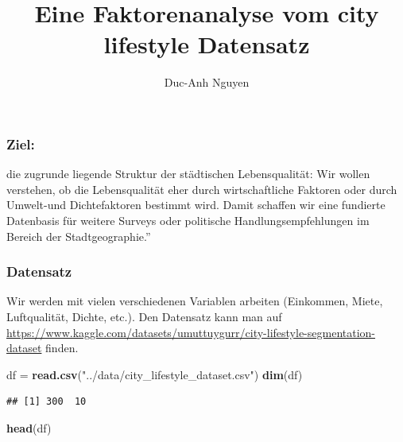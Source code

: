 \documentclass[
]{article}
\title{Eine Faktorenanalyse vom city lifestyle Datensatz}
\author{Duc-Anh Nguyen}
\date{}
\newenvironment{Shaded}{\begin{snugshade}}{\end{snugshade}}
\newcommand{\FunctionTok}[1]{\textcolor[rgb]{0.13,0.29,0.53}{\textbf{#1}}}
\newcommand{\NormalTok}[1]{#1}
\newcommand{\OtherTok}[1]{\textcolor[rgb]{0.56,0.35,0.01}{#1}}
\newcommand{\StringTok}[1]{\textcolor[rgb]{0.31,0.60,0.02}{#1}}
\begin{document}
\maketitle

\subsubsection{Ziel:}\label{ziel}

die zugrunde liegende Struktur der städtischen Lebensqualität: Wir
wollen verstehen, ob die Lebensqualität eher durch wirtschaftliche
Faktoren oder durch Umwelt-und Dichtefaktoren bestimmt wird. Damit
schaffen wir eine fundierte Datenbasis für weitere Surveys oder
politische Handlungsempfehlungen im Bereich der Stadtgeographie.''

\subsubsection{Datensatz}\label{datensatz}

Wir werden mit vielen verschiedenen Variablen arbeiten (Einkommen,
Miete, Luftqualität, Dichte, etc.). Den Datensatz kann man auf
\url{https://www.kaggle.com/datasets/umuttuygurr/city-lifestyle-segmentation-dataset}
finden.

\begin{Shaded}
\begin{Highlighting}[]
\NormalTok{df }\OtherTok{=} \FunctionTok{read.csv}\NormalTok{(}\StringTok{"../data/city\_lifestyle\_dataset.csv"}\NormalTok{)}
\FunctionTok{dim}\NormalTok{(df)}
\end{Highlighting}
\end{Shaded}

\begin{verbatim}
## [1] 300  10
\end{verbatim}

\begin{Shaded}
\begin{Highlighting}[]
\FunctionTok{head}\NormalTok{(df)}
\end{Highlighting}
\end{Shaded}
\end{document}
